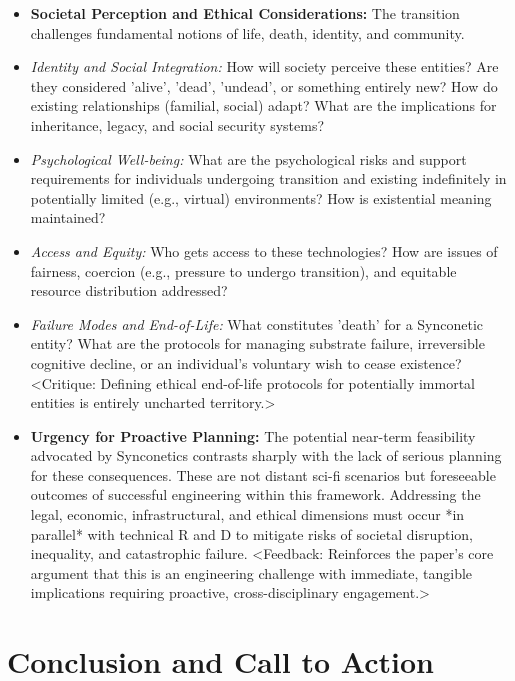 \documentclass[10pt]{article}
\begin{document}
\begin{sloppypar}
\begin{itemize}
    \item \textbf{Societal Perception and Ethical Considerations:} The transition challenges fundamental notions of life, death, identity, and community.
    \item \textit{Identity and Social Integration:} How will society perceive these entities? Are they considered 'alive', 'dead', 'undead', or something entirely new? How do existing relationships (familial, social) adapt? What are the implications for inheritance, legacy, and social security systems?
    \item \textit{Psychological Well-being:} What are the psychological risks and support requirements for individuals undergoing transition and existing indefinitely in potentially limited (e.g., virtual) environments? How is existential meaning maintained?
    \item \textit{Access and Equity:} Who gets access to these technologies? How are issues of fairness, coercion (e.g., pressure to undergo transition), and equitable resource distribution addressed?
    \item \textit{Failure Modes and End-of-Life:} What constitutes 'death' for a Synconetic entity? What are the protocols for managing substrate failure, irreversible cognitive decline, or an individual's voluntary wish to cease existence? <Critique: Defining ethical end-of-life protocols for potentially immortal entities is entirely uncharted territory.>

    \item \textbf{Urgency for Proactive Planning:} The potential near-term feasibility advocated by Synconetics contrasts sharply with the lack of serious planning for these consequences. These are not distant sci-fi scenarios but foreseeable outcomes of successful engineering within this framework. Addressing the legal, economic, infrastructural, and ethical dimensions must occur *in parallel* with technical R and D to mitigate risks of societal disruption, inequality, and catastrophic failure. <Feedback: Reinforces the paper's core argument that this is an engineering challenge with immediate, tangible implications requiring proactive, cross-disciplinary engagement.>

  \end{itemize}

  \section{Conclusion and Call to Action}
  \label{sec:conclusion}


\end{sloppypar}
\end{document}
